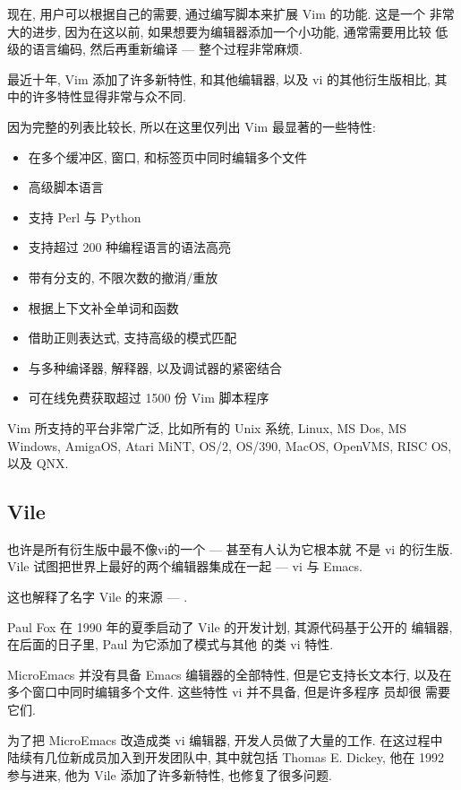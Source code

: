 现在, 用户可以根据自己的需要, 通过编写脚本来扩展 Vim 的功能. 这是一个
非常大的进步, 因为在这以前, 如果想要为编辑器添加一个小功能, 通常需要用比较
低级的语言编码, 然后再重新编译 --- 整个过程非常麻烦.

最近十年, Vim 添加了许多新特性, 和其他编辑器, 以及 vi 的其他衍生版相比,
其中的许多特性显得非常与众不同.

因为完整的列表比较长, 所以在这里仅列出 Vim 最显著的一些特性:
\begin{itemize}
    \item 在多个缓冲区, 窗口, 和标签页中同时编辑多个文件
    \item 高级脚本语言
    \item 支持 Perl 与 Python
    \item 支持超过 200 种编程语言的语法高亮
    \item 带有分支的, 不限次数的撤消/重放
    \item 根据上下文补全单词和函数
    \item 借助正则表达式, 支持高级的模式匹配
    \item 与多种编译器, 解释器, 以及调试器的紧密结合
    \item 可在线免费获取超过 1500 份 Vim 脚本程序
\end{itemize}
Vim 所支持的平台非常广泛, 比如所有的 Unix 系统, Linux, MS Dos, MS Windows,
AmigaOS, Atari MiNT, OS/2, OS/390, MacOS, OpenVMS, RISC OS, 以及 QNX.

\subsection{Vile}
\label{subsec:vile}
 也许是所有衍生版中最不像vi的一个 --- 甚至有人认为它根本就
不是 vi 的衍生版. Vile 试图把世界上最好的两个编辑器集成在一起 --- vi
与 Emacs.

这也解释了名字 Vile 的来源 --- .

Paul Fox 在 1990 年的夏季启动了 Vile 的开发计划, 其源代码基于公开的
 编辑器, 在后面的日子里, Paul 为它添加了模式与其他
的类 vi 特性.

MicroEmacs 并没有具备 Emacs 编辑器的全部特性, 但是它支持长文本行,
以及在 多个窗口中同时编辑多个文件. 这些特性 vi 并不具备, 但是许多程序
员却很 需要它们.

为了把 MicroEmacs 改造成类 vi 编辑器, 开发人员做了大量的工作. 在这过程中
陆续有几位新成员加入到开发团队中, 其中就包括 Thomas E. Dickey, 他在 1992
参与进来, 他为 Vile 添加了许多新特性, 也修复了很多问题.


